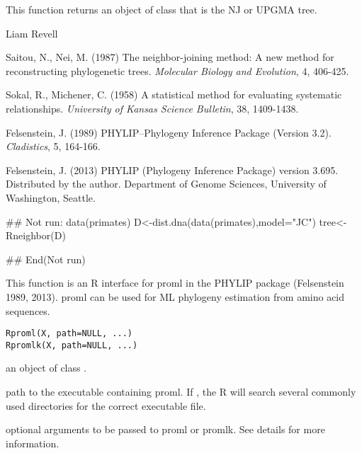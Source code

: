 \documentclass[a4paper]{book}
\begin{document}
%
\begin{Value}
This function returns an object of class  that is the NJ or UPGMA tree.
\end{Value}
%
\begin{Author}\relax
Liam Revell 
\end{Author}
%
\begin{References}\relax
Saitou, N., Nei, M. (1987) The neighbor-joining method: A new method for reconstructing phylogenetic trees. \emph{Molecular Biology and Evolution}, 4, 406-425.

Sokal, R., Michener, C. (1958) A statistical method for evaluating systematic relationships. \emph{University of Kansas Science Bulletin}, 38, 1409-1438.	

Felsenstein, J. (1989) PHYLIP--Phylogeny Inference Package (Version 3.2). \emph{Cladistics}, 5, 164-166.

Felsenstein, J. (2013) PHYLIP (Phylogeny Inference Package) version 3.695. Distributed by the author. Department of Genome Sciences, University of Washington, Seattle.
\end{References}
%
\begin{SeeAlso}\relax
{}
\end{SeeAlso}
%
\begin{Examples}
\begin{ExampleCode}
## Not run: 
data(primates)
D<-dist.dna(data(primates),model="JC")
tree<-Rneighbor(D)

## End(Not run)
\end{ExampleCode}
\end{Examples}
%
\begin{Description}\relax
This function is an R interface for proml in the PHYLIP package (Felsenstein 1989, 2013). proml can be used for ML phylogeny estimation from amino acid sequences.
\end{Description}
%
\begin{Usage}
\begin{verbatim}
Rproml(X, path=NULL, ...)
Rpromlk(X, path=NULL, ...)
\end{verbatim}
\end{Usage}
%
\begin{Arguments}
\begin{ldescription}
\item[\code{X}] an object of class .
\item[\code{path}] path to the executable containing proml. If , the R will search several commonly used directories for the correct executable file.
\item[\code{...}] optional arguments to be passed to proml or promlk. See details for more information.
\end{ldescription}
\end{Arguments}
\end{document}
